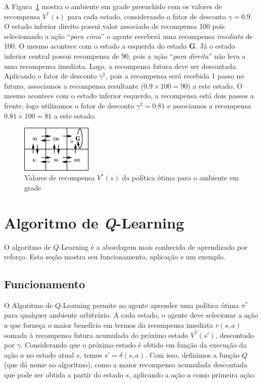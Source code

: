 A Figura~\ref{fig:exemplo-rl-recompensas} mostra o ambiente em grade preenchido com os valores de recompensa $V^*(s)$ para cada estado, considerando o fator de desconto $\gamma = 0.9$. O estado inferior direito possui valor associado de recompensa 100 pois selecionando a ação ``\textit{para cima}'' o agente receberá uma recompensa \textit{imediata} de 100. O mesmo acontece com o estado a esquerda do estado \textbf{G}. Já o estado inferior central possui recompensa de 90, pois a ação ``\textit{para direita}'' não leva a uma recompensa imediata. Logo, a recompensa futura deve ser descontada. Aplicando o fator de desconto $\gamma^1$, pois a recompensa será recebida 1 passo no futuro, associamos a recompensa resultante ($0.9 \times 100 = 90$) a este estado. O mesmo acontece com o estado inferior esquerdo, a recompensa está dois passos a frente, logo utilizamos o fator de desconto $\gamma^2 = 0.81$ e associamos a recompensa $0.81 \times 100 = 81$ a este estado.

\begin{figure}[h]
	\centering
	\includegraphics[width=0.3\textwidth]{img/exemplo-rl-recompensas}
	\caption{Valores de recompensa $V^*(s)$ da política ótima para o ambiente em grade}
	\label{fig:exemplo-rl-recompensas}
\end{figure}

\section{Algoritmo de \textit{Q}-Learning}

O algoritmo de $Q$-Learning é a abordagem mais conhecida de aprendizado por reforço. Esta seção mostra seu funcionamento, aplicação e um exemplo.

\subsection{Funcionamento}

O Algoritmo de $Q$-Learning permite ao agente aprender uma política ótima $\pi^*$ para qualquer ambiente arbitrário. A cada estado, o agente deve selecionar a ação $a$ que forneça o maior benefício em termos da recompensa imediata $r(s, a)$ somada à recompensa futura acumulada do próximo estado $V^*(s')$, descontado por $\gamma$. Considerando que o próximo estado é obtido em função da execução da ação $a$ no estado atual $s$, temos $s' = \delta(s, a)$. Com isso, definimos a função $Q$ (que dá nome ao algoritmo), como a maior recompensa acumulada descontada que pode ser obtida a partir do estado $s$, aplicando a ação $a$ como primeira ação.

